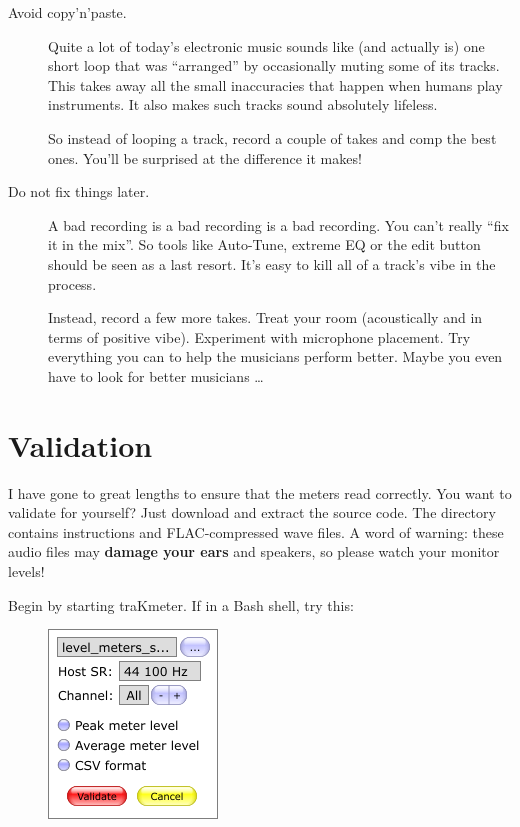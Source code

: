 \begin{description}
\item[Avoid copy'n'paste.]  Quite a lot of today's electronic music
  sounds like (and actually is) one short loop that was ``arranged''
  by occasionally muting some of its tracks.  This takes away all the
  small inaccuracies that happen when humans play instruments.  It
  also makes such tracks sound absolutely lifeless.

  So instead of looping a track, record a couple of takes and comp the
  best ones.  You'll be surprised at the difference it makes!

\item[Do not fix things later.]  A bad recording is a bad recording is
  a bad recording.  You can't really ``fix it in the mix''.  So tools
  like Auto-Tune, extreme EQ or the edit button should be seen as a
  last resort.  It's easy to kill all of a track's vibe in the
  process.

  Instead, record a few more takes.  Treat your room (acoustically and
  in terms of positive vibe).  Experiment with microphone placement.
  Try everything you can to help the musicians perform better.  Maybe
  you even have to look for better musicians \dots

\end{description}

\chapter{Validation}
\label{chap:validation}

I have gone to great lengths to ensure that the meters read correctly.
You want to validate for yourself?  Just download and extract the
source code.  The directory  contains instructions
and FLAC-compressed wave files.  A word of warning: these audio files
may \textbf{damage your ears} and speakers, so please watch your
monitor levels!

Begin by starting traKmeter.  If in a Bash shell, try this:


\begin{figure}
\includegraphics[scale=0.60,clip]{include/images/dialog_validation.png}
\end{figure}


